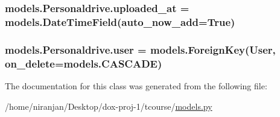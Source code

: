 \subsubsection[{\texorpdfstring{uploaded\+\_\+at}{uploaded_at}}]{\setlength{\rightskip}{0pt plus 5cm}models.\+Personaldrive.\+uploaded\+\_\+at = models.\+Date\+Time\+Field(auto\+\_\+now\+\_\+add=True)\hspace{0.3cm}{\ttfamily [static]}}\hypertarget{classmodels_1_1_personaldrive_a9178b14fa1898652abfb740f2ae8573e}{}\label{classmodels_1_1_personaldrive_a9178b14fa1898652abfb740f2ae8573e}
\subsubsection[{\texorpdfstring{user}{user}}]{\setlength{\rightskip}{0pt plus 5cm}models.\+Personaldrive.\+user = models.\+Foreign\+Key(User, on\+\_\+delete=models.\+C\+A\+S\+C\+A\+DE)\hspace{0.3cm}{\ttfamily [static]}}\hypertarget{classmodels_1_1_personaldrive_ad12833f4899ed324257c155ea3804bd3}{}\label{classmodels_1_1_personaldrive_ad12833f4899ed324257c155ea3804bd3}


The documentation for this class was generated from the following file\+:\begin{DoxyCompactItemize}
\item 
/home/niranjan/\+Desktop/dox-\/proj-\/1/tcourse/\hyperlink{models_8py}{models.\+py}\end{DoxyCompactItemize}

